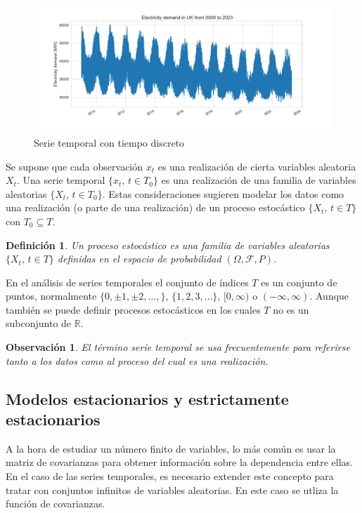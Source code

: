 \documentclass[12pt,twoside]{article}
\newtheorem{definition}[theorem]{Definición}
\newtheorem{remark}[theorem]{Observación}
\begin{document}
\begin{center}
\begin{figure}[h]
    \includegraphics[width = \textwidth]{imagenes/TimeSeries.png}
    \caption{Serie temporal con tiempo discreto }\label{fig:TimeSeries}
\end{figure}
\end{center}




Se supone que cada observación $x_t$ es una realización de cierta variables aleatoria $X_t$. Una serie temporal $\{x_t, \, t \in T_0\}$ es una realización de una familia de variables aleatorias $\{X_t, \, t \in T_0\}$. Estas consideraciones sugieren modelar los datos como una realización (o parte de una realización) de un proceso estocástico $\{X_t, \, t \in T\}$ con $T_0 \subseteq T$.

\begin{definition}
    Un proceso estocástico es una familia de variables aleatorias $\{X_t, \, t \in T\}$ definidas en el espacio de probabilidad $(\Omega, \mathcal{F}, P)$.
\end{definition}

En el análisis de series temporales el conjunto de índices $T$ es un conjunto de puntos, normalmente $\{0, \pm1, \pm2, \dotsc, \}$, $\{1,2,3,\dotsc\}$, $[0, \infty)$ o $(-\infty, \infty)$. Aunque también se puede definir procesos estocásticos en los cuales $T$ no es un subconjunto de $\mathbb{R}$.



\begin{remark}
    El término serie temporal se usa frecuentemente para referirse tanto a los datos como al proceso del cual es una realización.
\end{remark}


\subsection{Modelos estacionarios y estrictamente estacionarios}
A la hora de estudiar un número finito de variables, lo más común es usar la matriz de covarianzas para obtener información sobre la dependencia entre ellas. En el caso de las series temporales, es necesario extender este concepto para tratar con conjuntos infinitos de variables aleatorias. En este caso se utliza la función de covarianzas.
\end{document}
